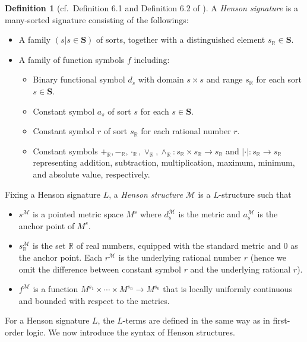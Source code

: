 \documentclass[11pt]{amsart}
\theoremstyle{definition}
\newtheorem{definition}[theorem]{Definition}
\theoremstyle{remark}
\def\RR{\mathbb{R}}
\begin{document}
\begin{definition}[cf.\ Definition 6.1 and Definition 6.2 of \cite{DI2017}]
A \emph{Henson signature} is a many-sorted signature consisting of the followings:
\begin{itemize}
    \item A family $(s|s\in \mathbf{S})$ of sorts, together with a distinguished element $s_{\mathbb{R}}\in \mathbf{S}$. 
    \item A family of function symbols $f$ including:
        \begin{itemize}
        \item Binary functional symbol $d_s$ with domain $s\times s$ and range $s_{\mathbb{R}}$ for each sort $s\in \mathbf{S}$.
        \item Constant symbol $a_s$ of sort $s$ for each $s\in \mathbf{S}$.
        \item Constant symbol $r$ of sort $s_{\mathbb{R}}$ for each rational number $r$.
         \item Constant symbols $+_\RR, -_\RR, \cdot_\RR, \lor_\RR, \land_\RR: s_{\RR} \times s_{\RR} \to s_{\RR}$ and $|\cdot|:s_{\RR} \to s_{\RR}$ representing addition, subtraction, multiplication, maximum, minimum, and absolute value, respectively.
        \end{itemize}
\end{itemize}

Fixing a Henson signature $L$, a \emph{Henson structure} $\mathcal{M}$ is a $L$-structure such that 
\begin{itemize}
    \item $s^{\mathcal{M}}$ is a pointed metric space $M^{s}$ where $d_s^{\mathcal{M}}$ is the metric and $a_s^{\mathcal{M}}$ is the anchor point of $M^{s}$. 
    \item $s_{\mathbb{R}}^{\mathcal{M}}$ is the set $\mathbb{R}$ of real numbers, equipped with the standard metric and $0$ as the anchor point. Each $r^{\mathcal{M}}$ is the underlying rational number $r$  (hence we omit the difference between constant symbol $r$ and the underlying rational $r$). 
     
    \item $f^{\mathcal{M}}$ is a function $M^{s_1}\times\cdots \times M^{s_n}\to M^{s_0}$ that is  locally uniformly continuous and bounded with respect to the metrics. 
\end{itemize}

\end{definition}

For a Henson signature $L$, the $L$-terms are defined in the same way as in first-order logic. We now introduce the syntax of Henson structures.
\end{document}
